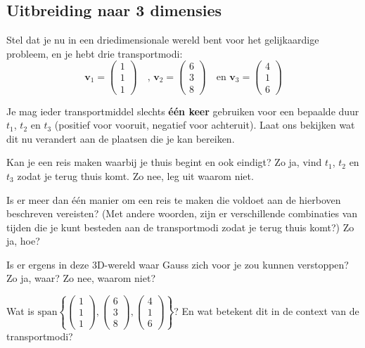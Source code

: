 \documentclass{ximera}
\begin{document}
\subsection*{Uitbreiding naar 3 dimensies}
Stel dat je nu in een driedimensionale wereld bent voor het gelijkaardige probleem, en je hebt drie transportmodi:
\[\mathbf{v}_1 = \begin{pmatrix} 1 \\ 1 \\ 1 \end{pmatrix}\quad \text{, }\mathbf{v}_2 = \begin{pmatrix} 6 \\ 3 \\ 8 \end{pmatrix}\quad \text{en }\mathbf{v}_3 = \begin{pmatrix} 4 \\ 1 \\ 6 \end{pmatrix}\]

Je mag ieder transportmiddel slechts \textbf{één keer} gebruiken voor een bepaalde duur \(t_1\), \(t_2\) en \(t_3\) (positief voor vooruit, negatief voor achteruit).
Laat ons bekijken wat dit nu verandert aan de plaatsen die je kan bereiken.

\begin{exercise}
Kan je een reis maken waarbij je thuis begint en ook eindigt?
Zo ja, vind \(t_1\), \(t_2\) en \(t_3\) zodat je terug thuis komt.
Zo nee, leg uit waarom niet.

\begin{question}
Is er meer dan één manier om een reis te maken die voldoet aan de hierboven beschreven vereisten?
(Met andere woorden, zijn er verschillende combinaties van tijden die je kunt besteden aan de transportmodi zodat je terug thuis komt?)
Zo ja, hoe?
\end{question}

\begin{question}
Is er ergens in deze 3D-wereld waar Gauss zich voor je zou kunnen verstoppen?
Zo ja, waar?
Zo nee, waarom niet?
\end{question}

\begin{question}
Wat is \(\text{span}\left\{\begin{pmatrix} 1 \\ 1 \\ 1 \end{pmatrix}, \begin{pmatrix} 6 \\ 3 \\ 8 \end{pmatrix}, \begin{pmatrix} 4 \\ 1 \\ 6 \end{pmatrix}\right\}\)?
En wat betekent dit in de context van de transportmodi?
\end{question}
\end{exercise}
\end{document}
